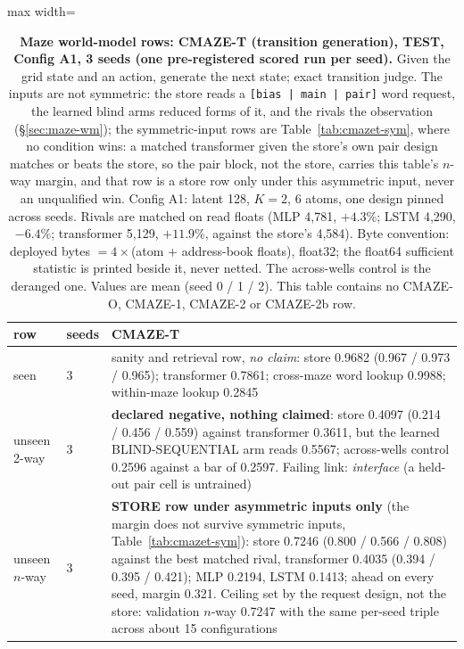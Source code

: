 \documentclass{article} %
\begin{document}
\begin{table}[h]
\centering\scriptsize
\caption{\textbf{Maze world-model rows: CMAZE-T (transition generation), TEST, Config A1, 3 seeds %
(one pre-registered scored run per seed).} Given the grid state and an action, generate the next
state; exact transition judge. The inputs are not symmetric: the store reads a \texttt{[bias | main |
pair]} word request, the learned blind arms reduced forms of it, and the rivals the observation
(\S\ref{sec:maze-wm}); the symmetric-input rows are Table~\ref{tab:cmazet-sym}, where no condition
wins: a matched transformer given the store's own pair design matches or beats the store, so the %
pair block, not the store, carries this table's $n$-way margin, and that row is a store row only
under this asymmetric input, never an unqualified win. Config A1: latent 128, $K=2$, 6 atoms, one design pinned across seeds. %
Rivals are matched on read floats (MLP 4,781, $+4.3\%$; LSTM 4,290, $-6.4\%$; transformer 5,129, %
$+11.9\%$, against the store's 4,584). %
Byte convention: deployed bytes $=4\times$(atom $+$
address-book floats), float32; the float64 sufficient statistic is printed beside it, never netted.
The across-wells control is the deranged one. Values are mean (seed 0 / 1 / 2). This table contains
no CMAZE-O, CMAZE-1, CMAZE-2 or CMAZE-2b row.}
\label{tab:cmazet}\label{tab:cmaze-del}
\setlength{\tabcolsep}{2pt}
\begin{adjustbox}{max width=\linewidth}\begin{tabular}{p{1.9cm}p{1.2cm}p{10.0cm}}
\toprule
row & seeds & CMAZE-T \\
\midrule
seen & 3 & sanity and retrieval row, \emph{no claim}: store 0.9682 (0.967 / 0.973 / 0.965); transformer 0.7861; cross-maze word lookup 0.9988; within-maze lookup 0.2845 \\
unseen 2-way & 3 & \textbf{declared negative, nothing claimed}: store 0.4097 (0.214 / 0.456 / 0.559) against transformer 0.3611, but the learned BLIND-SEQUENTIAL arm reads 0.5567; across-wells control 0.2596 against a bar of 0.2597. Failing link: \emph{interface} (a held-out pair cell is untrained) \\
unseen $n$-way & 3 & \textbf{STORE row under asymmetric inputs only} (the margin does not survive symmetric inputs, Table~\ref{tab:cmazet-sym}): store 0.7246 (0.800 / 0.566 / 0.808) against the best matched rival, transformer 0.4035 (0.394 / 0.395 / 0.421); MLP 0.2194, LSTM 0.1413; ahead on every seed, margin 0.321. Ceiling set by the request design, not the store: validation $n$-way 0.7247 with the same per-seed triple across about 15 configurations \\

\end{tabular}
\end{adjustbox}
\end{table}
\end{document}
